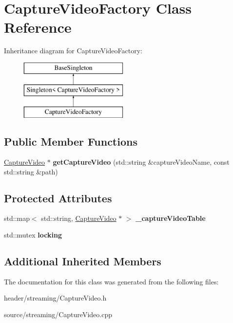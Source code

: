 \hypertarget{class_capture_video_factory}{}\section{Capture\+Video\+Factory Class Reference}
\label{class_capture_video_factory}
Inheritance diagram for Capture\+Video\+Factory\+:\begin{figure}[H]
\begin{center}
\leavevmode
\includegraphics[height=3.000000cm]{d6/d4b/class_capture_video_factory}
\end{center}
\end{figure}
\subsection*{Public Member Functions}
\begin{DoxyCompactItemize}
\item 
\mbox{\label{class_capture_video_factory_aa697f4a0893d7d5e023d0b69982bd7f1}} 
\hyperlink{class_capture_video}{Capture\+Video} $\ast$ {\bfseries get\+Capture\+Video} (std\+::string \&capture\+Video\+Name, const std\+::string \&path)
\end{DoxyCompactItemize}
\subsection*{Protected Attributes}
\begin{DoxyCompactItemize}
\item 
\mbox{\label{class_capture_video_factory_a748d0309d4f63f0c4d9cf5c642458637}} 
std\+::map$<$ std\+::string, \hyperlink{class_capture_video}{Capture\+Video} $\ast$ $>$ {\bfseries \+\_\+capture\+Video\+Table}
\item 
\mbox{\label{class_capture_video_factory_afdbe26984eff4b7fc17a016403416723}} 
std\+::mutex {\bfseries locking}
\end{DoxyCompactItemize}
\subsection*{Additional Inherited Members}


The documentation for this class was generated from the following files\+:\begin{DoxyCompactItemize}
\item 
header/streaming/Capture\+Video.\+h\item 
source/streaming/Capture\+Video.\+cpp\end{DoxyCompactItemize}
